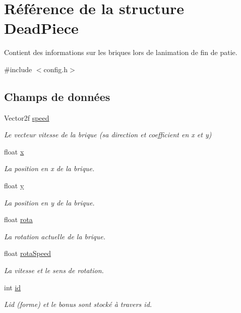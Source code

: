\hypertarget{struct_dead_piece}{}\section{Référence de la structure Dead\+Piece}
\label{struct_dead_piece}


Contient des informations sur les briques lors de l\textquotesingle{}animation de fin de patie.  




{\ttfamily \#include $<$config.\+h$>$}

\subsection*{Champs de données}
\begin{DoxyCompactItemize}
\item 
Vector2f \hyperlink{struct_dead_piece_a2651ca771e4f8d4c489fd929edf1c974}{speed}
\begin{DoxyCompactList}\small\item\em Le vecteur vitesse de la brique (sa direction et coefficient en x et y) \end{DoxyCompactList}\item 
float \hyperlink{struct_dead_piece_a6ea3c8634975a90b9803f1b019fbe70e}{x}
\begin{DoxyCompactList}\small\item\em La position en x de la brique. \end{DoxyCompactList}\item 
float \hyperlink{struct_dead_piece_aa4e4a5879eae22061e50009e94314955}{y}
\begin{DoxyCompactList}\small\item\em La position en y de la brique. \end{DoxyCompactList}\item 
float \hyperlink{struct_dead_piece_a572fc55ff5cd7b10b7a9d71d8725f52d}{rota}
\begin{DoxyCompactList}\small\item\em La rotation actuelle de la brique. \end{DoxyCompactList}\item 
float \hyperlink{struct_dead_piece_a5cb892f5556b4dbd28c00c4ef9ace50c}{rota\+Speed}
\begin{DoxyCompactList}\small\item\em La vitesse et le sens de rotation. \end{DoxyCompactList}\item 
int \hyperlink{struct_dead_piece_a3966b5734b0b309bf38ab7c22e381346}{id}
\begin{DoxyCompactList}\small\item\em L\textquotesingle{}id (forme) et le bonus sont stocké à travers id. \end{DoxyCompactList}\end{DoxyCompactItemize}


